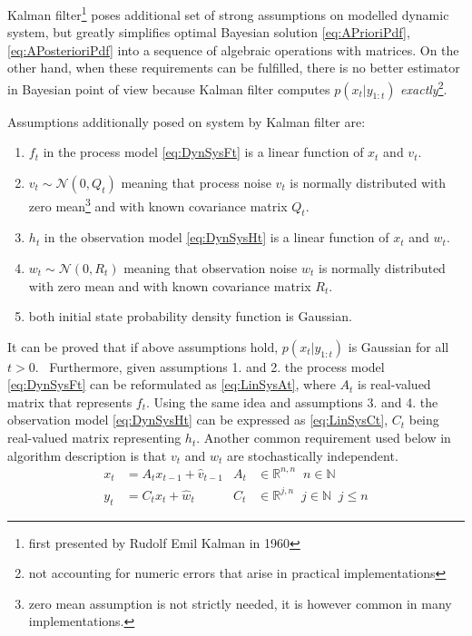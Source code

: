 \documentclass[a4paper,12pt,oneside]{report}
\newcommand{\pdf}{probability density function}
\begin{document}
Kalman filter\footnote{first presented by Rudolf Emil Kalman in 1960} poses additional set of strong
assumptions on modelled dynamic system, but greatly
simplifies optimal Bayesian solution \eqref{eq:APrioriPdf}, \eqref{eq:APosterioriPdf} into a
sequence of algebraic operations with matrices. On the other hand, when these requirements can be
fulfilled, there is no better estimator in Bayesian point of view because Kalman filter computes
\(p(x_t | y_{1:t})\) \emph{exactly}\footnote{not accounting for numeric errors that arise in
practical implementations}.

Assumptions additionally posed on system by Kalman filter are: %
\begin{enumerate}
	\item \(f_t\) in the process model \eqref{eq:DynSysFt} is a linear function of \(x_t\) and
	\(v_t\).
	\item \(v_t \sim \mathcal{N}(0, Q_t)\) meaning that process noise \(v_t\) is normally
	distributed with zero mean\footnote{zero mean assumption is not strictly needed, it is however
	common in many implementations.} and with known covariance matrix \(Q_t\).
	\item \(h_t\) in the observation model \eqref{eq:DynSysHt} is a linear function of \(x_t\) and
	\(w_t\).
	\item \(w_t \sim \mathcal{N}(0, R_t)\) meaning that observation noise \(w_t\) is normally distributed
	with zero mean and with known covariance matrix \(R_t\).
	\item both initial state {\pdf} is Gaussian.
\end{enumerate}

It can be proved that if above assumptions hold, \(p(x_t|y_{1:t})\) is Gaussian for all
\(t > 0\).~\cite{AruMasGor:02} Furthermore, given assumptions 1. and 2. the process model
\eqref{eq:DynSysFt} can be reformulated as \eqref{eq:LinSysAt}, where \(A_t\) is real-valued matrix
that represents \(f_t\).
Using the same idea and assumptions 3. and 4. the observation model \eqref{eq:DynSysHt} can be
expressed as \eqref{eq:LinSysCt}, \(C_t\) being real-valued matrix representing \(h_t\). Another
common requirement used below in algorithm description is that \(v_t\) and \(w_t\) are
stochastically independent.
\begin{align}
	x_t &= A_t x_{t-1} + \hat{v}_{t-1} & A_t &\in \mathbb{R}^{n,n} \;\; n \in \mathbb{N} \label{eq:LinSysAt} \\
	y_t &= C_t x_t + \hat{w}_t & C_t &\in \mathbb{R}^{j,n} \;\; j \in \mathbb{N} \;\; j \leq n \label{eq:LinSysCt}
\end{align}
\end{document}
